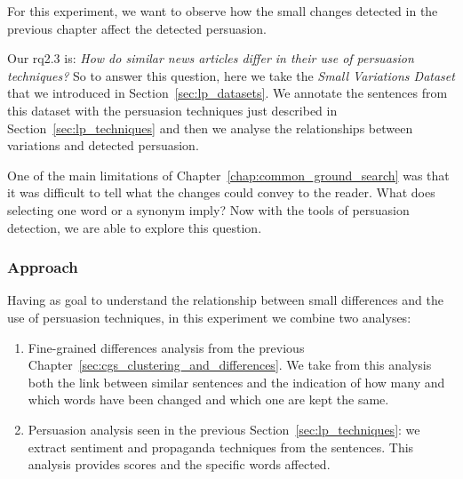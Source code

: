 

For this experiment, we want to observe how the small changes detected in the previous chapter affect the detected persuasion.

Our \acrshort{rq}2.3 is: \emph{How do similar news articles differ in their use of persuasion techniques?}
So to answer this question, here we take
the \emph{Small Variations Dataset} that we introduced in Section~\ref{sec:lp_datasets}.
We annotate the sentences from this dataset with the persuasion techniques just described in Section~\ref{sec:lp_techniques} and then we analyse the relationships between variations and detected persuasion.

One of the main limitations of Chapter~\ref{chap:common_ground_search} was that it was difficult to tell what the changes could convey to the reader. What does selecting one word or a synonym imply? Now with the tools of persuasion detection, we are able to explore this question.




\subsubsection{Approach}
\label{ssec:lp_relationship_small_variations_appr}

Having as goal to understand the relationship between small differences
and the use of persuasion techniques, in this experiment we combine two analyses:
\begin{enumerate}
    \item Fine-grained differences analysis from the previous Chapter~\ref{sec:cgs_clustering_and_differences}. We take from this analysis both the link between similar sentences and the indication of how many and which words have been changed and which one are kept the same.
    \item Persuasion analysis seen in the previous Section~\ref{sec:lp_techniques}: we extract sentiment and propaganda techniques from the sentences. This analysis provides scores and the specific words affected.
\end{enumerate}

